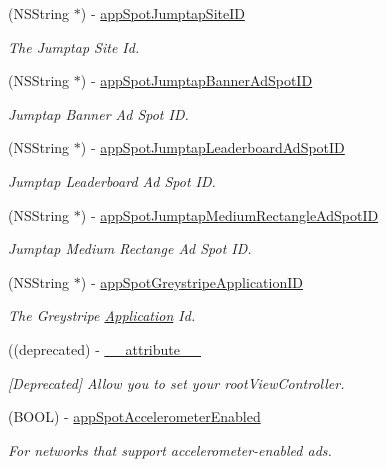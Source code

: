 \begin{Indent}
\begin{DoxyCompactItemize}
(N\+S\+String $\ast$) -\/ \hyperlink{protocolFlurryAdDelegate_01-p_a7099c0b2d18dac48c8a887efa0cfbca6}{app\+Spot\+Jumptap\+Site\+ID}
\begin{DoxyCompactList}\small\item\em The Jumptap Site Id. \end{DoxyCompactList}\item 
(N\+S\+String $\ast$) -\/ \hyperlink{protocolFlurryAdDelegate_01-p_a45802f6353c98d52e470dec6bc5ea9cb}{app\+Spot\+Jumptap\+Banner\+Ad\+Spot\+ID}
\begin{DoxyCompactList}\small\item\em Jumptap Banner Ad Spot ID. \end{DoxyCompactList}\item 
(N\+S\+String $\ast$) -\/ \hyperlink{protocolFlurryAdDelegate_01-p_a50616f32d54066bfee17998faa126218}{app\+Spot\+Jumptap\+Leaderboard\+Ad\+Spot\+ID}
\begin{DoxyCompactList}\small\item\em Jumptap Leaderboard Ad Spot ID. \end{DoxyCompactList}\item 
(N\+S\+String $\ast$) -\/ \hyperlink{protocolFlurryAdDelegate_01-p_a929633c2f77ecc7bc030e01663d9e312}{app\+Spot\+Jumptap\+Medium\+Rectangle\+Ad\+Spot\+ID}
\begin{DoxyCompactList}\small\item\em Jumptap Medium Rectange Ad Spot ID. \end{DoxyCompactList}\item 
(N\+S\+String $\ast$) -\/ \hyperlink{protocolFlurryAdDelegate_01-p_a10602b838acd93e710ef1aab13a20ee5}{app\+Spot\+Greystripe\+Application\+ID}
\begin{DoxyCompactList}\small\item\em The Greystripe \hyperlink{classApplication}{Application} Id. \end{DoxyCompactList}\item 
((deprecated) -\/ \hyperlink{protocolFlurryAdDelegate_01-p_ae9d0c306e8852b82f57c2d321e4f95ba}{\+\_\+\+\_\+attribute\+\_\+\+\_\+}
\begin{DoxyCompactList}\small\item\em \mbox{[}Deprecated\mbox{]} Allow you to set your root\+View\+Controller. \end{DoxyCompactList}\item 
(B\+O\+OL) -\/ \hyperlink{protocolFlurryAdDelegate_01-p_a8f9730aef4765d97bfbb612cdcfa74dc}{app\+Spot\+Accelerometer\+Enabled}
\begin{DoxyCompactList}\small\item\em For networks that support accelerometer-\/enabled ads. \end{DoxyCompactList}\end{DoxyCompactItemize}
\end{Indent}


